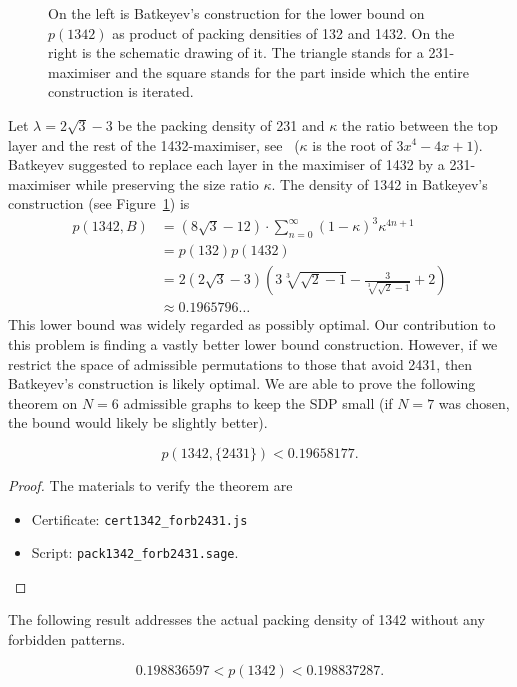 \documentclass[12pt, a4paper, twoside]{report}
\begin{document}
\begin{figure}[ht]
\centering \acdbmax
\caption{\small On the left is Batkeyev's construction for the lower bound on $p(1342)$ as product of packing densities of 132 and 1432. On the right is the schematic drawing of it. The triangle stands for a 231-maximiser and the square stands for the part inside which the entire construction is iterated.}
\label{fig:batkeyev}
\end{figure}

Let $\lambda = 2\sqrt{3}-3$ be the packing density of 231 and $\kappa$ the ratio between the top layer  and the rest of the 1432-maximiser, see~\cite{price1997packing} ($\kappa$ is the root of $3x^4-4x+1$). Batkeyev suggested to replace each layer in the maximiser of 1432 by a 231-maximiser while preserving the size ratio $\kappa$. The density of 1342 in Batkeyev's construction (see Figure~\ref{fig:batkeyev}) is 
\begin{align*}
p(1342, B) &=(8 \sqrt{3}-12)\cdot \sum _{n=0}^{\infty } (1-\kappa)^3 \kappa ^{4n+1} \\
           &= p(132)p(1432)\\
           &= 2 \left(2 \sqrt{3}-3\right) \left(3 \sqrt[3]{\sqrt{2}-1}-\frac{3}{\sqrt[3]{\sqrt{2}-1}}+2\right)\\
           &\approx 0.1965796\ldots
\end{align*}
This lower bound was widely regarded as possibly optimal. Our contribution to this problem is finding a vastly better lower bound construction. However, if we restrict the space of admissible permutations to those that avoid 2431, then Batkeyev's construction is likely optimal. We are able to prove the following theorem on $N=6$ admissible graphs to keep the SDP small (if $N=7$ was chosen, the bound would likely be slightly better).

\begin{theorem}
$$p(1342,\{2431\}) < 0.19658177.$$
\end{theorem}
\begin{proof}The materials to verify the theorem are
  \begin{itemize}
  \item Certificate: \texttt{cert1342\_forb2431.js}
  \item Script: \texttt{pack1342\_forb2431.sage}.
  \end{itemize}
\end{proof}

The following result addresses the actual packing density of 1342 without any forbidden patterns.
\begin{theorem}
\label{thm:newbounds1342}
$$0.198836597 < p(1342) < 0.198837287.$$
\end{theorem}
\end{document}
